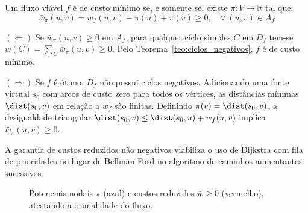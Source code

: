 \begin{teorema}
Um fluxo viável $f$ é de custo mínimo se, e somente se, existe $\pi: V \to \mathbb{R}$ tal que:
\begin{equation}
    \bar{w}_\pi(u,v) = w_f(u,v) - \pi(u) + \pi(v) \ge 0, \quad \forall\, (u,v) \in A_f
\end{equation}
\end{teorema}

\begin{demonstracao}
$(\Leftarrow)$ Se $\bar{w}_\pi(u,v) \ge 0$ em $A_f$, para qualquer ciclo simples $C$ em $D_f$ tem-se $w(C) = \sum_C \bar{w}_\pi(u,v) \ge 0$. Pelo Teorema~\ref{teo:ciclos_negativos}, $f$ é de custo mínimo.

\medskip
\noindent $(\Rightarrow)$ Se $f$ é ótimo, $D_f$ não possui ciclos negativos. Adicionando uma fonte virtual $s_0$ com arcos de custo zero para todos os vértices, as distâncias mínimas $\dist(s_0, v)$ em relação a $w_f$ são finitas. Definindo $\pi(v) = \dist(s_0, v)$, a desigualdade triangular $\dist(s_0, v) \le \dist(s_0, u) + w_f(u,v)$ implica $\bar{w}_\pi(u,v) \ge 0$.
\end{demonstracao}

A garantia de custos reduzidos não negativos viabiliza o uso de Dijkstra com fila de prioridades no lugar de Bellman-Ford no algoritmo de caminhos aumentantes sucessivos.

\begin{figure}[!ht]
\centering
{}
\caption{Potenciais nodais $\pi$ (azul) e custos reduzidos $\bar{w} \ge 0$ (vermelho), atestando a otimalidade do fluxo.}
\label{fig:custos_reduzidos}
\end{figure}


